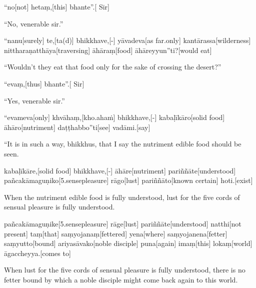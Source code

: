 \begin{samepage}
\begingl[glneveryline={\PaliGlossA,\PaliGlossB}]
“no[not] hetaṃ,[this] bhante”.[ Sir]
\endgl
\nopagebreak
\linespread{0.5}
\begin{spacin}{0.2}
{\PaliGlossFT “No, venerable sir.”}
\end{spacin}
\vskip 12pt
\end{samepage}
\begin{samepage}
\begingl[glneveryline={\PaliGlossA,\PaliGlossB}]
“nanu[surely] te,[ta(d)] bhikkhave,[-] yāvadeva[as far.only] kantārassa[wilderness] nittharaṇatthāya[traversing] āhāraṃ[food] āhāreyyun”ti?[would eat]
\endgl
\nopagebreak
\linespread{0.5}
\begin{spacin}{0.2}
{\PaliGlossFT “Wouldn’t they eat that food only for the sake of crossing the desert?”}
\end{spacin}
\vskip 12pt
\end{samepage}
\begin{samepage}
\begingl[glneveryline={\PaliGlossA,\PaliGlossB}]
“evaṃ,[thus] bhante”.[ Sir]
\endgl
\nopagebreak
\linespread{0.5}
\begin{spacin}{0.2}
{\PaliGlossFT “Yes, venerable sir.”}
\end{spacin}
\vskip 12pt
\end{samepage}
\begin{samepage}
\begingl[glneveryline={\PaliGlossA,\PaliGlossB}]
“evameva[only] khvāhaṃ,[kho.ahaṁ] bhikkhave,[-] kabaḷīkāro[solid food] āhāro[nutriment] daṭṭhabbo”ti[see] vadāmi.[say]
\endgl
\nopagebreak
\linespread{0.5}
\begin{spacin}{0.2}
{\PaliGlossFT “It is in such a way, bhikkhus, that I say the nutriment edible food should be seen.}
\end{spacin}
\vskip 12pt
\end{samepage}
\begin{samepage}
\begingl[glneveryline={\PaliGlossA,\PaliGlossB}]
kabaḷīkāre,[solid food] bhikkhave,[-] āhāre[nutriment] pariññāte[understood] pañcakāmaguṇiko[5.sensepleasure] rāgo[lust] pariññāto[known certain] hoti.[exist]
\endgl
\nopagebreak
\linespread{0.5}
\begin{spacin}{0.2}
{\PaliGlossFT When the nutriment edible food is fully understood, lust for the five cords of sensual pleasure is fully understood.}
\end{spacin}
\vskip 12pt
\end{samepage}
\begin{samepage}
\begingl[glneveryline={\PaliGlossA,\PaliGlossB}]
pañcakāmaguṇike[5.sensepleasure] rāge[lust] pariññāte[understood] natthi[not present] taṃ[that] saṃyojanaṃ[fettered] yena[where] saṃyojanena[fetter] saṃyutto[bound] ariyasāvako[noble disciple] puna[again] imaṃ[this] lokaṃ[world] āgaccheyya.[comes to]
\endgl
\nopagebreak
\linespread{0.5}
\begin{spacin}{0.2}
{\PaliGlossFT When lust for the five cords of sensual pleasure is fully understood, there is no fetter bound by which a noble disciple might come back again to this world.}
\end{spacin}
\vskip 12pt
\end{samepage}
